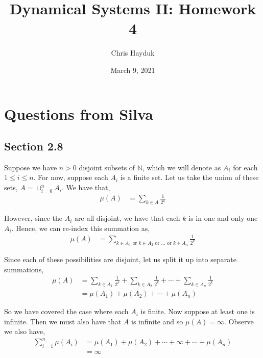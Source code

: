 \documentclass[12pt]{article}
\newenvironment{problem}[2][Problem]{\begin{trivlist}
\item[\hskip \labelsep {\bfseries #1}\hskip \labelsep {\bfseries #2.}]}{\end{trivlist}}
\begin{document}
\title{Dynamical Systems II: Homework 4}

\author{Chris Hayduk}
\date{March 9, 2021}

\maketitle

\section{Questions from Silva}

\subsection{Section 2.8}

\begin{problem}{1}
\end{problem}

Suppose we have $n > 0$ disjoint subsets of $\mathbb{N}$, which we will denote as $A_i$ for each $1 \leq i \leq n$. For now, suppose each $A_i$ is a finite set. Let us take the union of these sets, $A = \sqcup_{i=0}^n A_i$. We have that,
\begin{align*}
\mu(A) &= \sum_{k \in A} \frac{1}{2^k}
\end{align*}

However, since the $A_i$ are all disjoint, we have that each $k$ is in one and only one $A_i$. Hence, we can re-index this summation as,
\begin{align*}
\mu(A) &= \sum_{k \in A_1 \text{ or } k \in A_2 \text{ or } \ldots \text { or } k \in A_n} \frac{1}{2^k}
\end{align*}

Since each of these possibilities are disjoint, let us split it up into separate summations,
\begin{align*}
\mu(A) &= \sum_{k \in A_1} \frac{1}{2^k} + \sum_{k \in A_2} \frac{1}{2^k} + \cdots + \sum_{k \in A_n} \frac{1}{2^k}\\
&= \mu(A_1) + \mu(A_2) + \cdots + \mu(A_n)
\end{align*}

So we have covered the case where each $A_i$ is finite. Now suppose at least one is infinite. Then we must also have that $A$ is infinite and so $\mu(A) = \infty$. Observe we also have,
\begin{align*}
\sum_{i=1}^n \mu(A_i) &= \mu(A_1) + \mu(A_2) + \cdots + \infty + \cdots + \mu(A_n)\\
&= \infty
\end{align*}
\end{document}
